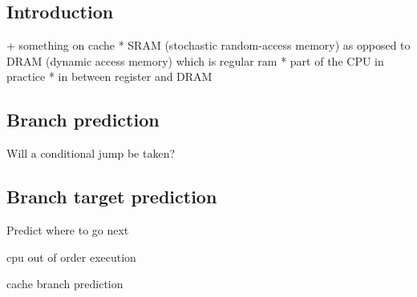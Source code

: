
\subsection{Introduction}

+ something on cache
  * SRAM (stochastic random-access memory) as opposed to DRAM (dynamic access memory) which is regular ram
  * part of the CPU in practice
  * in between register and DRAM

\subsection{Branch prediction}
Will a conditional jump be taken?

\subsection{Branch target prediction}
Predict where to go next

cpu out of order execution

cache
branch prediction


